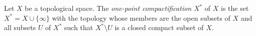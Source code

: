 Let $X$ be a topological space. The \emph{one-point compactification} $X^*$ of $X$ is the set $X^* = X \cup \{\infty\}$ with the topology whose members are the open subsets of $X$ and all subsets $U$ of $X^*$ such that $X^* \setminus U$ is a closed compact subset of $X$.

